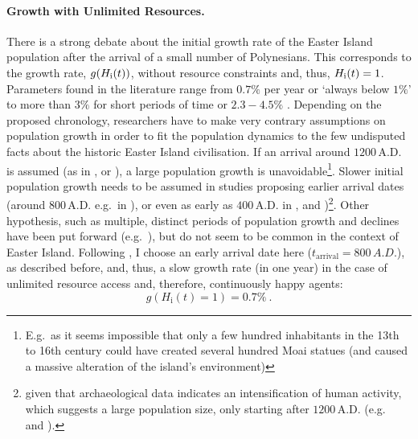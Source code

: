 \paragraph{Growth with Unlimited Resources.}
There is a strong debate about the initial growth rate of the Easter Island population after the arrival of a small number of Polynesians.
This corresponds to the growth rate, $g(H_{\rm i}(t))$, without resource constraints and, thus, $H_{\rm i}(t)=1$.
Parameters found in the literature range from $0.7\%$ per year \citep{Bahn2017} or `always below $1\%$' \citep{Brander1998} to more than $3\%$ \citep{Hunt2007} for short periods of time or $2.3-4.5\%$ \citep{Brandt2015}.
Depending on the proposed chronology, researchers have to make very contrary assumptions on population growth in order to fit the population dynamics to the few undisputed facts about the historic Easter Island civilisation. 
If an arrival around $1200\, \text{A.D.}$ is assumed (as in , or ), a large population growth is unavoidable\footnote{E.g.\ as it seems impossible that only a few hundred inhabitants in the 13th to 16th century could have created several hundred Moai statues (and caused a massive alteration of the island's environment)}.
Slower initial population growth needs to be assumed in studies proposing earlier arrival dates (around $800\, \text{A.D.}$ e.g.\ in ), or even as early as $400\, \text{A.D.}$ in , and )\footnote{given that archaeological data indicates an intensification of human activity, which suggests a large population size, only starting after $1200\, \text{A.D.}$ (e.g.\  and ).}.
Other hypothesis, such as multiple, distinct periods of population growth and declines have been put forward (e.g.\ ), but do not seem to be common in the context of Easter Island.
Following \citet{Bahn2017}, I choose an early arrival date here ($t_\text{arrival}=800\, A.D.$), as described before, and, thus, a slow growth rate (in one year) in the case of unlimited resource access and, therefore, continuously happy agents: 
\begin{equation}
	g(H_\text{i}(t)=1) = 0.7\% \ .
\end{equation}

